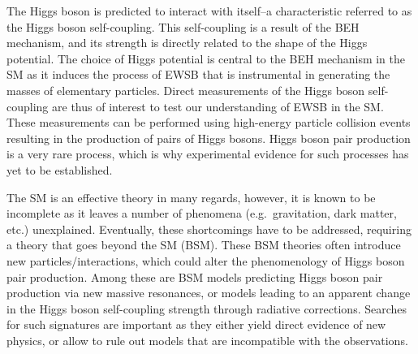 
%

The Higgs boson is predicted to interact with itself--a characteristic referred
to as the Higgs boson self-coupling. This self-coupling is a result of the BEH
mechanism, and its strength is directly related to the shape of the Higgs
potential. The choice of Higgs potential is central to the BEH mechanism in the
SM as it induces the process of EWSB that is instrumental in generating the
masses of elementary particles. Direct measurements of the Higgs boson
self-coupling are thus of interest to test our understanding of EWSB in the SM.
These measurements can be performed using high-energy particle collision events
resulting in the production of pairs of Higgs bosons. Higgs boson pair
production is a very rare process, which is why experimental evidence for such
processes has yet to be established.

The SM is an effective theory in many regards, however, it is known to be
incomplete as it leaves a number of phenomena (e.g.\ gravitation, dark matter,
etc.) unexplained. Eventually, these shortcomings have to be addressed,
requiring a theory that goes beyond the SM (BSM). These BSM theories often
introduce new particles/interactions, which could alter the phenomenology of
Higgs boson pair production. Among these are BSM models predicting Higgs boson
pair production via new massive resonances, or models leading to an apparent
change in the Higgs boson self-coupling strength through radiative
corrections. Searches for such signatures are important as they either yield
direct evidence of new physics, or allow to rule out models that are
incompatible with the observations.

